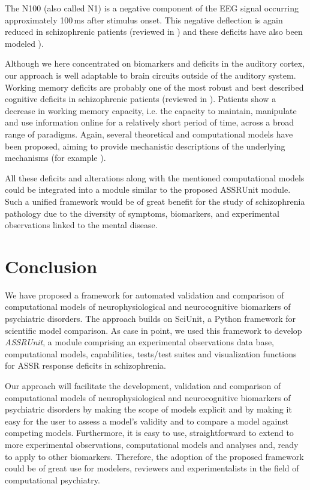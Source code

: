 \documentclass[CompPsych]{stjour}
\begin{document}
The N100 (also called N1) is a negative component of the EEG signal occurring approximately 100\,ms after stimulus onset. This negative deflection is again reduced in schizophrenic patients 
(reviewed in \cite{Rosburg2008,Rissling2010,Javitt2008}) and these deficits have also been modeled \cite{Ventouras2000}).

Although we here concentrated on biomarkers and deficits in the auditory cortex, our approach is well adaptable to brain circuits outside of the auditory system. 
Working memory deficits are probably one of the most robust and best described cognitive deficits in schizophrenic patients (reviewed in \cite{Piskulic2007,Lee2005}). Patients
show a decrease in working memory capacity, i.e. the capacity to maintain, manipulate and use information online for a relatively short period of time, across a broad range of paradigms.
Again, several theoretical and computational models have been proposed, aiming to provide mechanistic descriptions of the underlying mechanisms (for example \cite{Compte2000,Durstewitz2000,Wang2004,Singh2006,Wang2001,Cano2012}). 

All these deficits and alterations along with the mentioned computational models could be integrated into a module similar to the proposed ASSRUnit module.
Such a unified framework would be of great benefit for the study of schizophrenia pathology due to the diversity of symptoms, biomarkers, and experimental observations linked to the mental disease.

\section{Conclusion}
We have proposed a framework for automated validation and comparison of computational models of neurophysiological and 
neurocognitive biomarkers of psychiatric disorders. The approach builds on
SciUnit, a Python framework for scientific model comparison. As case in point, we used this framework to develop \textit{ASSRUnit}, a module comprising 
an experimental observations data base, computational models, capabilities, tests/test suites and visualization functions for
ASSR response deficits in schizophrenia. 

Our approach will facilitate the development, validation and comparison of computational models of neurophysiological 
and neurocognitive biomarkers of psychiatric disorders by making the scope of models explicit and by 
making it easy for the user to assess a model's validity and to compare a model against competing models. Furthermore, it is easy to use, 
straightforward to extend to more experimental observations, computational models and analyses and,
ready to apply to other biomarkers. Therefore, the adoption of the proposed framework could be of great use for modelers, reviewers and 
experimentalists in the field of computational psychiatry.
\end{document}
